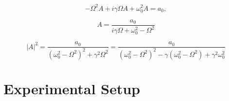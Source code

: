 \documentclass{a4paper,twoside,11pt}[scrartcl]
\begin{document}
\begin{equation}
-\Omega^{2}A+i\gamma\Omega A+\omega_{0}^{2}A=a_{0},
\end{equation}

\begin{equation}
A=\frac{a_{0}}{i\gamma\Omega+\omega_{0}^{2}-\Omega^{2}}
\end{equation}

\begin{equation}
|A|^{2}=\frac{a_{0}}{(\omega_{0}^{2}-\Omega^{2})^{2}+\gamma^{2}\Omega^{2}}=\frac{a_{0}}{(\omega_{0}^{2}-\Omega^{2})^{2}-\gamma(\omega_{0}^{2}-\Omega^{2})+\gamma^{2}\omega_{0}^{2}}
\end{equation}

\section{Experimental Setup}
\end{document}
